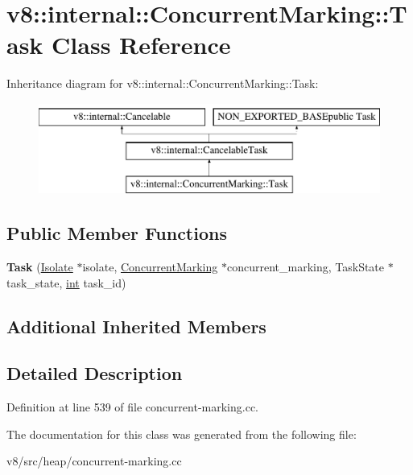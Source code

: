 \hypertarget{classv8_1_1internal_1_1ConcurrentMarking_1_1Task}{}\section{v8\+:\+:internal\+:\+:Concurrent\+Marking\+:\+:Task Class Reference}
\label{classv8_1_1internal_1_1ConcurrentMarking_1_1Task}
Inheritance diagram for v8\+:\+:internal\+:\+:Concurrent\+Marking\+:\+:Task\+:\begin{figure}[H]
\begin{center}
\leavevmode
\includegraphics[height=3.000000cm]{classv8_1_1internal_1_1ConcurrentMarking_1_1Task}
\end{center}
\end{figure}
\subsection*{Public Member Functions}
\begin{DoxyCompactItemize}
\item 
\mbox{\label{classv8_1_1internal_1_1ConcurrentMarking_1_1Task_a537abb646d8a98cc81c738f084942645}} 
{\bfseries Task} (\mbox{\hyperlink{classv8_1_1internal_1_1Isolate}{Isolate}} $\ast$isolate, \mbox{\hyperlink{classv8_1_1internal_1_1ConcurrentMarking}{Concurrent\+Marking}} $\ast$concurrent\+\_\+marking, Task\+State $\ast$task\+\_\+state, \mbox{\hyperlink{classint}{int}} task\+\_\+id)
\end{DoxyCompactItemize}
\subsection*{Additional Inherited Members}


\subsection{Detailed Description}


Definition at line 539 of file concurrent-\/marking.\+cc.



The documentation for this class was generated from the following file\+:\begin{DoxyCompactItemize}
\item 
v8/src/heap/concurrent-\/marking.\+cc\end{DoxyCompactItemize}
